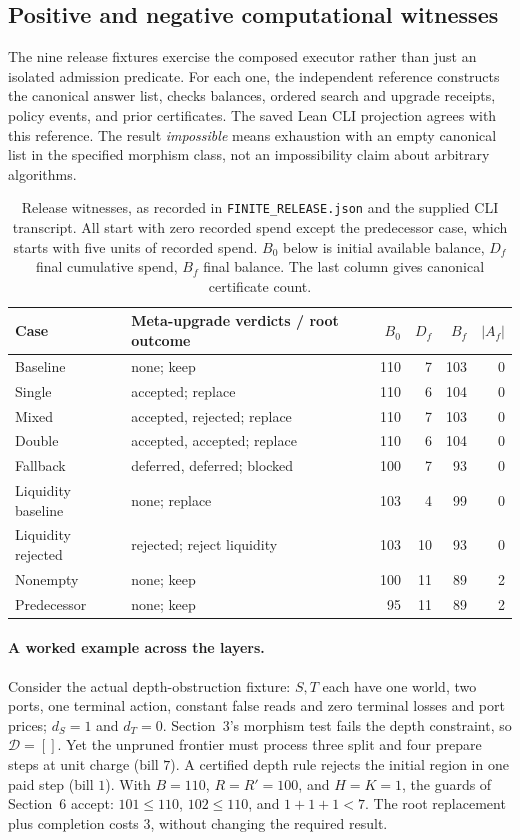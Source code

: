 \documentclass[10pt,letterpaper]{article}
\newcommand{\CanonRef}{\mathcal D}
\newcommand{\rc}[1]{\texttt{#1}}
\begin{document}
\clearpage
\subsection{Positive and negative computational witnesses}
The nine release fixtures exercise the composed executor rather than just an isolated admission predicate. For each one, the independent reference constructs the canonical answer list, checks balances, ordered search and upgrade receipts, policy events, and prior certificates. The saved Lean CLI projection agrees with this reference. The result \emph{impossible} means exhaustion with an empty canonical list in the specified morphism class, not an impossibility claim about arbitrary algorithms.

\begin{table}[htbp]
\centering\small
\caption{Release witnesses, as recorded in \rc{FINITE\_RELEASE.json} and the supplied CLI transcript. All start with zero recorded spend except the predecessor case, which starts with five units of recorded spend. $B_0$ below is initial available balance, $D_f$ final cumulative spend, $B_f$ final balance. The last column gives canonical certificate count.}\label{tab:release-cases}
\begin{tabularx}{\linewidth}{@{}lXrrrr@{}}\toprule
Case & Meta-upgrade verdicts / root outcome & $B_0$ & $D_f$ & $B_f$ & $|A_f|$\\\midrule
Baseline & none; keep & 110 & 7 & 103 & 0\\
Single & accepted; replace & 110 & 6 & 104 & 0\\
Mixed & accepted, rejected; replace & 110 & 7 & 103 & 0\\
Double & accepted, accepted; replace & 110 & 6 & 104 & 0\\
Fallback & deferred, deferred; blocked & 100 & 7 & 93 & 0\\
Liquidity baseline & none; replace & 103 & 4 & 99 & 0\\
Liquidity rejected & rejected; reject liquidity & 103 & 10 & 93 & 0\\
Nonempty & none; keep & 100 & 11 & 89 & 2\\
Predecessor & none; keep & 95 & 11 & 89 & 2\\\bottomrule
\end{tabularx}
\end{table}

\paragraph{A worked example across the layers.}
Consider the actual depth-obstruction fixture: $S,T$ each have one world, two ports, one terminal action, constant false reads and zero terminal losses and port prices; $d_S=1$ and $d_T=0$. Section~3's morphism test fails the depth constraint, so $\CanonRef=[]$. Yet the unpruned frontier must process three split and four prepare steps at unit charge (bill $7$). A certified depth rule rejects the initial region in one paid step (bill $1$). With $B=110$, $R=R'=100$, and $H=K=1$, the guards of Section~6 accept: $101\le110$, $102\le110$, and $1+1+1<7$. The root replacement plus completion costs $3$, without changing the required result.
\end{document}
